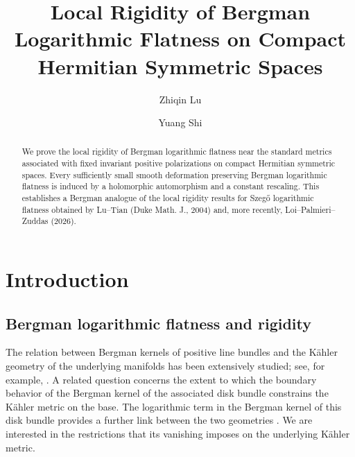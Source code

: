 \documentclass[11pt,reqno]{amsart}
\theoremstyle{corollary}
\theoremstyle{conjecture}
\theoremstyle{assumption}
\theoremstyle{proposition}
\theoremstyle{remark}
\numberwithin{equation}{section}
\begin{document}
\title[Local Rigidity of Bergman Log-Flatness]{Local Rigidity of Bergman Logarithmic Flatness on Compact Hermitian Symmetric Spaces}


\author{Zhiqin Lu}
\address{Department of Mathematics, University of California, Irvine, Irvine, CA 92697, USA}

\author{Yuang Shi}
\address{School of Mathematical Sciences, Shanghai Jiao Tong University, Shanghai 200240, China}

\begin{abstract}
We prove the local rigidity of Bergman logarithmic flatness near the standard metrics associated with fixed invariant positive polarizations on compact Hermitian symmetric spaces. Every sufficiently small smooth deformation preserving Bergman logarithmic flatness is induced by a holomorphic automorphism and a constant rescaling. This establishes a Bergman analogue of the local rigidity results for Szegő logarithmic flatness obtained by Lu--Tian (Duke Math. J., 2004) and, more recently, Loi--Palmieri--Zuddas (2026).
\end{abstract}

\maketitle
\tableofcontents

\section{Introduction}
\subsection{Bergman logarithmic flatness and rigidity}

The relation between Bergman kernels of positive line bundles and the K\"ahler geometry of the underlying manifolds has been
extensively studied; see, for example, \cite{Tian1990,Zelditch1998,Catlin1999,Lu2000,Donaldson2001,DaiLiuMa2006,BermanBerndtssonSjostrand2008,Xu2012,DonaldsonSun2014}. A related question concerns the extent to which the boundary behavior of the Bergman kernel of the associated disk bundle constrains the K\"ahler metric on the base. The logarithmic term in the Bergman kernel of this disk bundle provides a further link between the two geometries \cite{LuTian2004,EnglisZhang2010,LoiMossaZuddas2017,EbenfeltXiaoXu2026}. We are interested in the restrictions that its vanishing imposes on the underlying K\"ahler metric.
\end{document}
